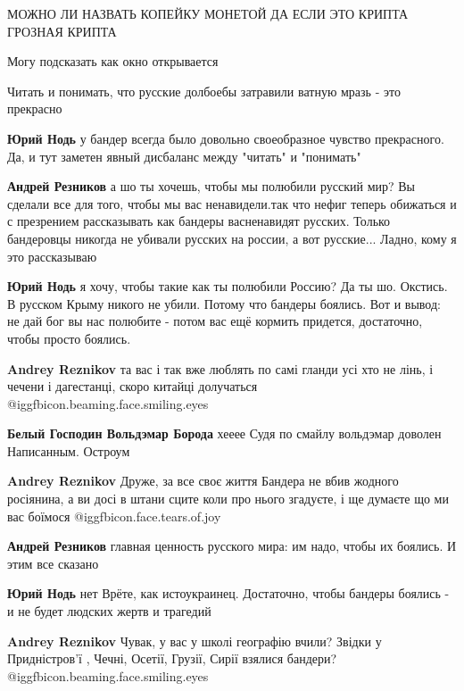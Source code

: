 \begin{itemize}
МОЖНО ЛИ НАЗВАТЬ КОПЕЙКУ МОНЕТОЙ ДА ЕСЛИ ЭТО КРИПТА ГРОЗНАЯ КРИПТА

Могу подсказать как окно открывается

Читать и понимать, что русские долбоебы затравили ватную мразь - это прекрасно

\begin{itemize} %
\textbf{Юрий Нодь} у бандер всегда было довольно своеобразное чувство прекрасного.
Да, и тут заметен явный дисбаланс между "читать" и "понимать"

\textbf{Андрей Резников} а шо ты хочешь, чтобы мы полюбили русский мир?
Вы сделали все для того, чтобы мы вас ненавидели.так что нефиг теперь обижаться и с презрением рассказывать как бандеры васненавидят русских.
Только бандеровцы никогда не убивали русских на россии, а вот русские... Ладно, кому я это рассказываю

\textbf{Юрий Нодь} я хочу, чтобы такие как ты полюбили Россию?
Да ты шо. Окстись.
В русском Крыму никого не убили. Потому что бандеры боялись. Вот и вывод: не дай бог вы нас полюбите - потом вас ещё кормить придется, достаточно, чтобы просто боялись.

\textbf{Andrey Reznikov} та вас і так вже люблять по самі гланди усі хто не лінь, і чечени і дагестанці, скоро китайці долучаться  @igg{fbicon.beaming.face.smiling.eyes} 

\textbf{Белый Господин Вольдэмар Борода} хееее
Судя по смайлу вольдэмар доволен
Написанным. Остроум

\textbf{Andrey Reznikov} Друже, за все своє життя Бандера не вбив жодного росіянина, а ви досі в штани сците коли про нього згадуєте, і ще думаєте що ми вас боїмося  @igg{fbicon.face.tears.of.joy} 

\textbf{Андрей Резников} главная ценность русского мира: им надо, чтобы их боялись. И этим все сказано

\textbf{Юрий Нодь} нет
Врёте, как истоукраинец.
Достаточно, чтобы бандеры боялись - и не будет людских жертв и трагедий

\textbf{Andrey Reznikov} Чувак, у вас у школі географію вчили?
Звідки у Придністров'ї , Чечні, Осетії, Грузії, Сирії взялися бандери?
 @igg{fbicon.beaming.face.smiling.eyes} 


\end{itemize}
\end{itemize}
